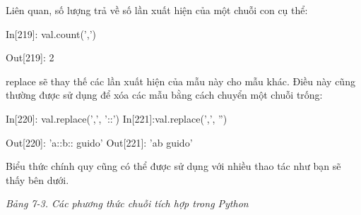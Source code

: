 Liên quan, số lượng trả về số lần xuất hiện của một chuỗi con cụ thể:\par
\hspace{1cm}In\hspace{3mm}[219]:\hspace{3mm} val.count(',')\par
\hspace{1cm}Out[219]:\hspace{3mm} 2\par
replace sẽ thay thế các lần xuất hiện của mẫu này cho mẫu khác. Điều này cũng thường được sử dụng để xóa các mẫu bằng cách chuyển một chuỗi trống:\par
\hspace{1cm}In\hspace{3mm}[220]:\hspace{3mm} val.replace(',', '::') \hspace{2cm} In\hspace{3mm}[221]:\hspace{3mm}val.replace(',', '') \par
\hspace{1cm}Out[220]:\hspace{3mm} 'a::b:: guido' \hspace{2,9cm} Out[221]:\hspace{3mm} 'ab guido' \par
Biểu thức chính quy cũng có thể được sử dụng với nhiều thao tác như bạn sẽ thấy bên dưới.\par
\textit{Bảng 7-3. Các phương thức chuỗi tích hợp trong Python}
